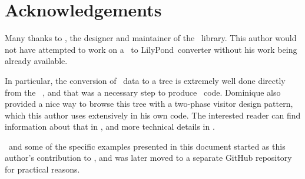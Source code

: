



\chapter{Acknowledgements}



Many thanks to \fober, the designer and maintainer of the \libmusicxml\ library. This author would not have attempted to work on a \mxml\ to LilyPond\ converter without his work being already available.

In particular, the conversion of \mxml\ data to a tree is extremely well done directly from the \mxml\ \dtd, and that was a necessary step to produce \lily\ code. Dominique also provided a nice way to browse this tree with a two-phase visitor design pattern, which this author uses extensively in his own code. The interested reader can find information about that in , and more technical details in .

\xmlToLy\ and some of the specific examples presented in this document started as this author's contribution to \libmusicxml, and was later moved to a separate GitHub repository for practical reasons.

